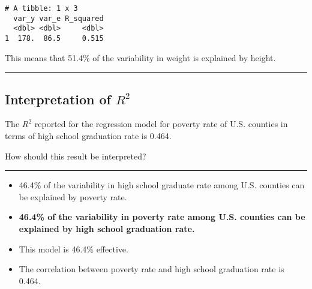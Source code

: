 \documentclass[
]{book}
\newenvironment{Shaded}{\begin{snugshade}}{\end{snugshade}}
\newcommand{\DataTypeTok}[1]{\textcolor[rgb]{0.13,0.29,0.53}{#1}}
\newcommand{\DecValTok}[1]{\textcolor[rgb]{0.00,0.00,0.81}{#1}}
\newcommand{\KeywordTok}[1]{\textcolor[rgb]{0.13,0.29,0.53}{\textbf{#1}}}
\newcommand{\NormalTok}[1]{#1}
\newcommand{\OperatorTok}[1]{\textcolor[rgb]{0.81,0.36,0.00}{\textbf{#1}}}
\newcommand{\StringTok}[1]{\textcolor[rgb]{0.31,0.60,0.02}{#1}}
\begin{document}
\begin{Shaded}
\end{Shaded}

\begin{verbatim}
# A tibble: 1 x 3
  var_y var_e R_squared
  <dbl> <dbl>     <dbl>
1  178.  86.5     0.515
\end{verbatim}

This means that 51.4\% of the variability in weight is explained by height.

\begin{center}\rule{0.5\linewidth}{0.5pt}\end{center}

\hypertarget{interpretation-of-r2}{%
\subsection*{\texorpdfstring{Interpretation of \(R^2\)}{Interpretation of R\^{}2}}\label{interpretation-of-r2}}

The \(R^2\) reported for the regression model for poverty rate of U.S. counties in terms of high school graduation rate is 0.464.

\begin{Shaded}
\end{Shaded}

How should this result be interpreted?

\begin{center}\rule{0.5\linewidth}{0.5pt}\end{center}

\begin{itemize}
\item
  46.4\% of the variability in high school graduate rate among U.S. counties can be explained by poverty rate.
\item
  \textbf{46.4\% of the variability in poverty rate among U.S. counties can be explained by high school graduation rate.}
\item
  This model is 46.4\% effective.
\item
  The correlation between poverty rate and high school graduation rate is 0.464.
\end{itemize}
\end{document}
